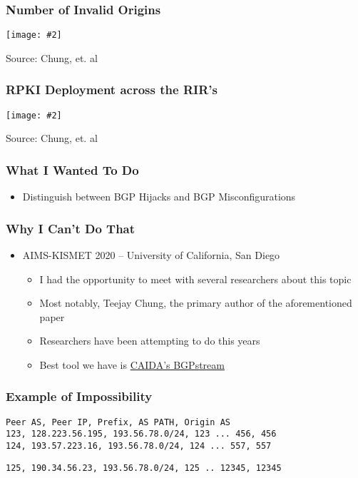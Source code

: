\documentclass{beamer}
\newcommand{\framedgraphic}[3]{
    \begin{frame}
        \frametitle{#1}
        \begin{center}
            \texttt{[image: \#2]}
        \end{center}
        {\small Source: #3}
    \end{frame}
}
\begin{document}
\framedgraphic{Number of Invalid Origins}{pictures/invalid-origins-chung.png}{Chung, et. al}
\framedgraphic{RPKI Deployment across the RIR's}{pictures/rpki-deployment-chung.png}{Chung, et. al}

\begin{frame}
    \frametitle{What I Wanted To Do}

    \begin{itemize}
        \item Distinguish between BGP Hijacks and BGP Misconfigurations
    \end{itemize}

\end{frame}

\begin{frame}
    \frametitle{Why I Can't Do That}

    \begin{itemize}
        \item AIMS-KISMET 2020 -- University of California, San Diego \pause
        \begin{itemize}
            \item I had the opportunity to meet with several researchers about this topic \pause
            \item Most notably, Teejay Chung, the primary author of the aforementioned paper \pause
            \item Researchers have been attempting to do this years \pause
            \item Best tool we have is \href{https://bgpstream.com/}{CAIDA's BGPstream}
        \end{itemize}
    \end{itemize}

\end{frame}

\begin{frame}[fragile]
    \frametitle{Example of Impossibility}

    \begin{Verbatim}[fontsize=\small]
Peer AS, Peer IP, Prefix, AS PATH, Origin AS
123, 128.223.56.195, 193.56.78.0/24, 123 ... 456, 456
124, 193.57.223.16, 193.56.78.0/24, 124 ... 557, 557
    \end{Verbatim}
    \pause

    \begin{Verbatim}[fontsize=\small]
125, 190.34.56.23, 193.56.78.0/24, 125 .. 12345, 12345
    \end{Verbatim}

\end{frame}
\end{document}
